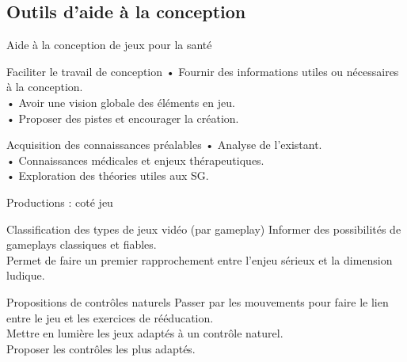 \documentclass{beamer}
\begin{document}
		
		\subsection{Outils d'aide à la conception}
		\begin{frame}{Aide à la conception de jeux pour la santé}
			\begin{exampleblock}{Faciliter le travail de conception}
			• Fournir des informations utiles ou nécessaires à la conception.\\
			• Avoir une vision globale des éléments en jeu.\\
			• Proposer des pistes et encourager la création.
			\end{exampleblock}
			
			\begin{block}{Acquisition des connaissances préalables}
				• Analyse de l'existant.\\
				• Connaissances médicales et enjeux thérapeutiques.\\
				• Exploration des théories utiles aux SG.				
			\end{block}
		\end{frame}
	
		\begin{frame}{Productions : coté jeu}
			\begin{block}{Classification des types de jeux vidéo (par gameplay)}
				Informer des possibilités de gameplays classiques et fiables.\\
				Permet de faire un premier rapprochement entre l'enjeu sérieux et la dimension ludique.
			\end{block}
			\begin{block}{Propositions de contrôles naturels}
			Passer par les mouvements pour faire le lien entre le jeu et les exercices de rééducation.\\
			Mettre en lumière les jeux adaptés à un contrôle naturel.\\
			Proposer les contrôles les plus adaptés.
			\end{block}			
		\end{frame}
		
\end{document}
